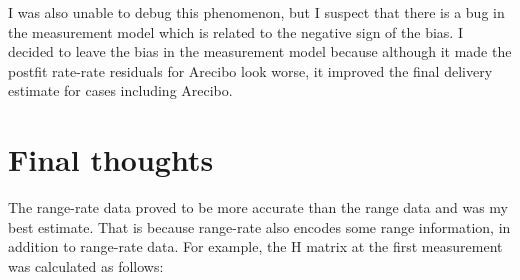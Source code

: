 \documentclass[conf]{new-aiaa}
\begin{document}
I was also unable to debug this phenomenon, but  I suspect that there is a bug in the measurement model which is related to the negative sign of the bias. I decided to leave the bias in the measurement model because although it made the postfit rate-rate residuals for Arecibo look worse, it improved the final delivery estimate for cases including Arecibo. 













\section{Final thoughts} 

The range-rate data proved to be more accurate than the range data and was my best estimate. That is because range-rate also encodes some range information, in addition to range-rate data. For example, the H matrix at the first measurement was calculated as follows:  
\end{document}
